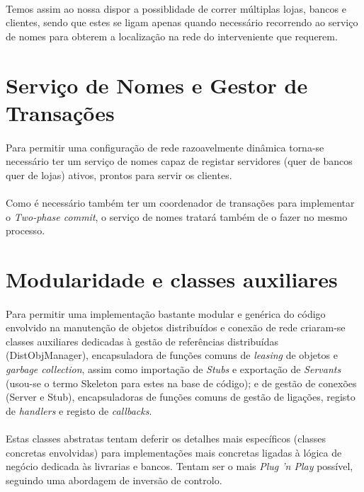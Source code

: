 \documentclass[11pt,a4paper]{report}
\begin{document}
\paragraph{}Temos assim ao nossa dispor a possiblidade de correr múltiplas lojas, bancos e clientes, sendo que estes se ligam apenas quando necessário recorrendo ao serviço de nomes para obterem a localização na rede do interveniente que requerem.

\section{Serviço de Nomes e Gestor de Transações}

\paragraph{}Para permitir uma configuração de rede razoavelmente dinâmica torna-se necessário ter um serviço de nomes capaz de registar servidores (quer de bancos quer de lojas) ativos, prontos para servir os clientes.

\paragraph{}Como é necessário também ter um coordenador de transações para implementar o \textit{Two-phase commit}, o serviço de nomes tratará também de o fazer no mesmo processo.

\section{Modularidade e classes auxiliares}

\paragraph{} Para permitir uma implementação bastante modular e genérica do código envolvido na manutenção de objetos distribuídos e conexão de rede criaram-se classes auxiliares dedicadas à gestão de referências distribuídas (DistObjManager), encapsuladora de funções comuns de \textit{leasing} de objetos e \textit{garbage collection}, assim como importação de \textit{Stubs
} e exportação de \textit{Servants} (usou-se o termo Skeleton para estes na base de código); e de gestão de conexões (Server e Stub), encapsuladoras de funções comuns de gestão de ligações, registo de \textit{handlers} e registo de \textit{callbacks}.

\paragraph{} Estas classes abstratas tentam deferir os detalhes mais específicos (classes concretas envolvidas) para implementações mais concretas ligadas à lógica de negócio dedicada às livrarias e bancos. Tentam ser o mais \textit{Plug 'n Play} possível, seguindo uma abordagem de inversão de controlo.
\end{document}
